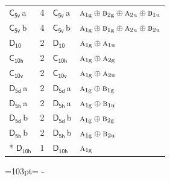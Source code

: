 \documentclass[10pt,a4paper]{article}
\newcommand{\needspace}[1]{\par\penalty-100\begingroup\dimen0=#1\relax\dimen2=\pagegoal
  \advance\dimen2-\pagetotal\ifdim\dimen0>\dimen2\relax\ifdim\dimen2>0pt\vfil\break\fi\fi
  \endgroup}
\numberwithin{equation}{section}
\newcommand{\grp}[1]{\mathsf{#1}}
\newcommand{\irr}[1]{\text{\normalfont\scshape #1}}
\newcommand{\ptag}[1]{\mathrm{#1}}
\newcommand{\clsletter}[1]{\,{\scriptsize\color{black!55}#1}}
\newlength{\fillwidth}\newlength{\cellwidth}\newlength{\colwidth}
\begin{document}
{\begin{longtable}{@{}lrl>{\RaggedRight\arraybackslash}p{\fillwidth}@{}}
\href{C5v.pdf}{$\grp{C_{5v}}$}\clsletter{a} & 4 & \href{C5v.pdf}{$\grp{C_{5v}}$}\clsletter{a} & $\irr{a}_{1\ptag{g}}\oplus \irr{b}_{2\ptag{g}}\oplus \irr{a}_{2\ptag{u}}\oplus \irr{b}_{1\ptag{u}}$\\
\href{C5v.pdf}{$\grp{C_{5v}}$}\clsletter{b} & 4 & \href{C5v.pdf}{$\grp{C_{5v}}$}\clsletter{b} & $\irr{a}_{1\ptag{g}}\oplus \irr{b}_{1\ptag{g}}\oplus \irr{a}_{2\ptag{u}}\oplus \irr{b}_{2\ptag{u}}$\\
\href{D10.pdf}{$\grp{D_{10}}$} & 2 & \href{D10.pdf}{$\grp{D_{10}}$} & $\irr{a}_{1\ptag{g}}\oplus \irr{a}_{1\ptag{u}}$\\
\href{C10h.pdf}{$\grp{C_{10h}}$} & 2 & \href{C10h.pdf}{$\grp{C_{10h}}$} & $\irr{a}_{1\ptag{g}}\oplus \irr{a}_{2\ptag{g}}$\\
\href{C10v.pdf}{$\grp{C_{10v}}$} & 2 & \href{C10v.pdf}{$\grp{C_{10v}}$} & $\irr{a}_{1\ptag{g}}\oplus \irr{a}_{2\ptag{u}}$\\
\href{D5d.pdf}{$\grp{D_{5d}}$}\clsletter{a} & 2 & \href{D5d.pdf}{$\grp{D_{5d}}$}\clsletter{a} & $\irr{a}_{1\ptag{g}}\oplus \irr{b}_{1\ptag{g}}$\\
\href{D5h.pdf}{$\grp{D_{5h}}$}\clsletter{a} & 2 & \href{D5h.pdf}{$\grp{D_{5h}}$}\clsletter{a} & $\irr{a}_{1\ptag{g}}\oplus \irr{b}_{1\ptag{u}}$\\
\href{D5d.pdf}{$\grp{D_{5d}}$}\clsletter{b} & 2 & \href{D5d.pdf}{$\grp{D_{5d}}$}\clsletter{b} & $\irr{a}_{1\ptag{g}}\oplus \irr{b}_{2\ptag{g}}$\\
\href{D5h.pdf}{$\grp{D_{5h}}$}\clsletter{b} & 2 & \href{D5h.pdf}{$\grp{D_{5h}}$}\clsletter{b} & $\irr{a}_{1\ptag{g}}\oplus \irr{b}_{2\ptag{u}}$\\*
\href{D10h.pdf}{$\grp{D_{10h}}$} & 1 & \href{D10h.pdf}{$\grp{D_{10h}}$} & $\irr{a}_{1\ptag{g}}$\\
\bottomrule\end{longtable}}
\needspace{103pt}
\end{document}
